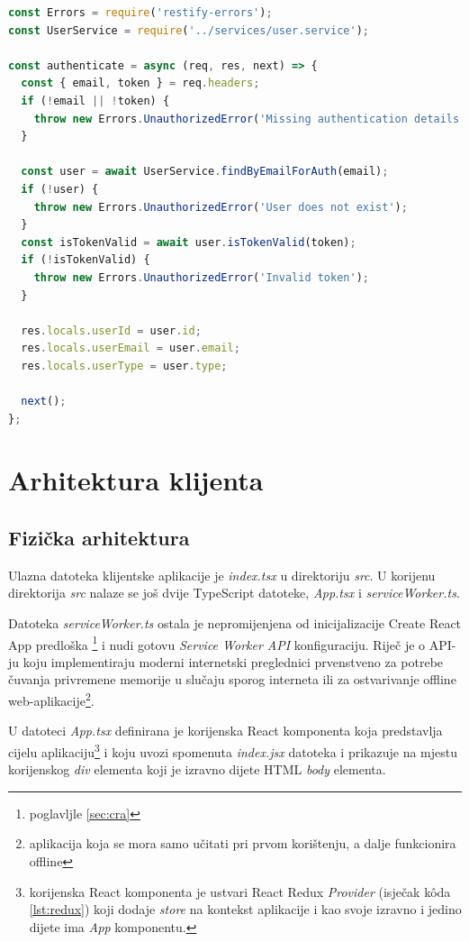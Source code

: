 \documentclass[times, utf8, diplomski, numeric]{fer}
\newcommand{\razmakp}{\vspace{18pt}}
\newcommand{\razmaks}{\vspace{10pt}}
\begin{document}
\razmakp %
\begin{lstlisting}[language=JavaScript, caption={Implementacija \emph{authenticate} metode u \emph{authentication.middleware.js}}, label={lst:auth}]
const Errors = require('restify-errors');
const UserService = require('../services/user.service');

const authenticate = async (req, res, next) => {
  const { email, token } = req.headers;
  if (!email || !token) {
    throw new Errors.UnauthorizedError('Missing authentication details');
  }

  const user = await UserService.findByEmailForAuth(email);
  if (!user) {
    throw new Errors.UnauthorizedError('User does not exist');
  }
  const isTokenValid = await user.isTokenValid(token);
  if (!isTokenValid) {
    throw new Errors.UnauthorizedError('Invalid token');
  }

  res.locals.userId = user.id;
  res.locals.userEmail = user.email;
  res.locals.userType = user.type;

  next();
};
\end{lstlisting}
\razmaks


\newpage
\section{Arhitektura klijenta}

\razmaks
\subsection{Fizička arhitektura}

Ulazna datoteka klijentske aplikacije je \emph{index.tsx} u direktoriju \emph{src}.
U korijenu direktorija \emph{src} nalaze se još dvije TypeScript datoteke, \emph{App.tsx} i \emph{serviceWorker.ts}.

Datoteka \emph{serviceWorker.ts} ostala je nepromijenjena od inicijalizacije Create React App predloška \footnote{poglavljle \ref{sec:cra}} i nudi gotovu \emph{Service Worker API} konfiguraciju.
Riječ je o API-ju koju implementiraju moderni internetski preglednici prvenstveno za potrebe čuvanja privremene memorije  u slučaju sporog interneta ili za ostvarivanje offline web-aplikacije\footnote{
    aplikacija koja se mora samo učitati pri prvom korištenju, a dalje funkcionira offline
}.

U datoteci \emph{App.tsx} definirana je korijenska React komponenta koja predstavlja cijelu aplikaciju\footnote{
    korijenska React komponenta je ustvari React Redux \emph{Provider} (isječak kôda \ref{lst:redux}) koji dodaje \emph{store} na kontekst aplikacije i kao svoje izravno i jedino dijete ima \emph{App} komponentu.
} i koju uvozi  spomenuta \emph{index.jsx} datoteka i prikazuje  na mjestu korijenskog \emph{div} elementa koji je izravno dijete HTML \emph{body} elementa.
\end{document}
